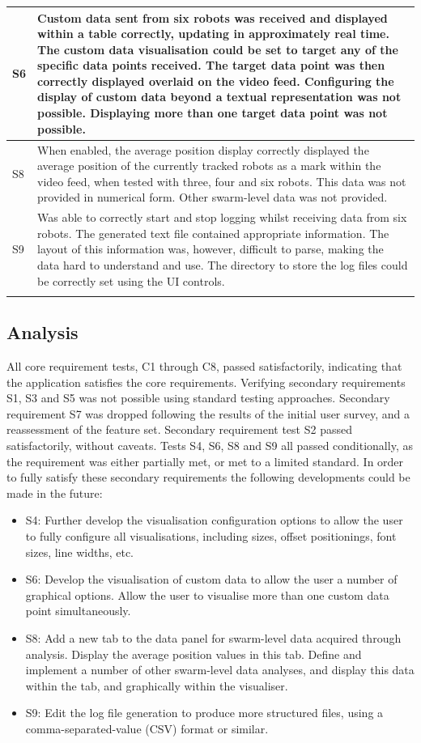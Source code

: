 \begin{longtable}{ l p{10cm} }
 S6 & Custom data sent from six robots was received and displayed within a table correctly, updating in approximately real time. The custom data visualisation could be set to target any of the specific data points received. The target data point was then correctly displayed overlaid on the video feed. Configuring the display of custom data beyond a textual representation was not possible. Displaying more than one target data point was not possible.\\\hline
 S8 & When enabled, the average position display correctly displayed the average position of the currently tracked robots as a mark within the video feed, when tested with three, four and six robots. This data was not provided in numerical form. Other swarm-level data was not provided.\\\hline
 S9 & Was able to correctly start and stop logging whilst receiving data from six robots. The generated text file contained appropriate information. The layout of this information was, however, difficult to parse, making the data hard to understand and use. The directory to store the log files could be correctly set using the UI controls.\\\hline
 \bottomrule\\
\end{longtable}

\subsection{Analysis}
All core requirement tests, C1 through C8, passed satisfactorily, indicating that the application satisfies the core requirements. Verifying secondary requirements S1, S3 and S5 was not possible using standard testing approaches. Secondary requirement S7 was dropped following the results of the initial user survey, and a reassessment of the feature set. Secondary requirement test S2 passed satisfactorily, without caveats. Tests S4, S6, S8 and S9 all passed conditionally, as the requirement was either partially met, or met to a limited standard. In order to fully satisfy these secondary requirements the following developments could be made in the future:

\begin{itemize}
 \item S4: Further develop the visualisation configuration options to allow the user to fully configure all visualisations, including sizes, offset positionings, font sizes, line widths, etc.
 \item S6: Develop the visualisation of custom data to allow the user a number of graphical options. Allow the user to visualise more than one custom data point simultaneously.
 \item S8: Add a new tab to the data panel for swarm-level data acquired through analysis. Display the average position values in this tab. Define and implement a number of other swarm-level data analyses, and display this data within the tab, and graphically within the visualiser.
 \item S9: Edit the log file generation to produce more structured files, using a comma-separated-value (CSV) format or similar.
\end{itemize}


